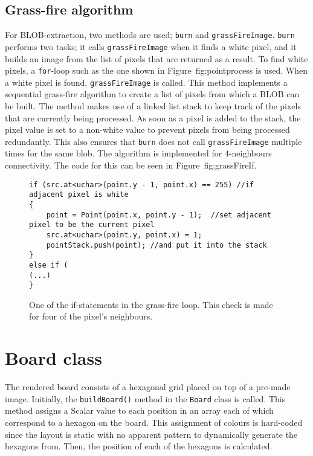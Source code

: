 \subsection{Grass-fire algorithm}
For BLOB-extraction, two methods are used; \texttt{burn} and \texttt{grassFireImage}. \texttt{burn} performs two tasks; it calls \texttt{grassFireImage} when it finds a white pixel, and it builds an image from the list of pixels that are returned as a result. To find white pixels, a \texttt{for}-loop such as the one shown in Figure~{fig:pointprocess} is used. When a white pixel is found, \texttt{grassFireImage} is called. This method implements a sequential grass-fire algorithm to create a list of pixels from which a BLOB can be built. The method makes use of a linked list stack to keep track of the pixels that are currently being processed. As soon as a pixel is added to the stack, the pixel value is set to a non-white value to prevent pixels from being processed redundantly. This also ensures that \texttt{burn} does not call \texttt{grassFireImage} multiple times for the same blob. The algorithm is implemented for 4-neighbours connectivity. The code for this can be seen in Figure~{fig:grassFireIf}. 

\begin{figure}
\begin{lstlisting}
if (src.at<uchar>(point.y - 1, point.x) == 255) //if adjacent pixel is white 
{
	point = Point(point.x, point.y - 1);  //set adjacent pixel to be the current pixel
	src.at<uchar>(point.y, point.x) = 1;
	pointStack.push(point); //and put it into the stack
}
else if (
(...)
}
\end{lstlisting}
\caption{One of the if-statements in the grass-fire loop. This check is made for four of the pixel's neighbours. \label{fig:grassFireIf}}
\end{figure}

\section{Board class}
The rendered board consists of a hexagonal grid placed on top of a pre-made image.  Initially, the \texttt{buildBoard()} method in the \texttt{Board} class is called. This method assigns a Scalar value to each position in an array each of which correspond to a hexagon on the board. This assignment of colours is hard-coded since the layout is static with no apparent pattern to dynamically generate the hexagons from. Then, the position of each of the hexagons is calculated.